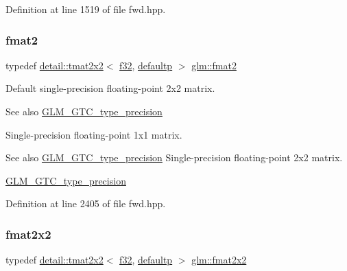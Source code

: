 Definition at line 1519 of file fwd.\+hpp.

\mbox{\label{group__gtc__type__precision_ga96b15c5eaecce87b352dab5d373da979}} 
\subsubsection{\texorpdfstring{fmat2}{fmat2}}
{\footnotesize\ttfamily typedef \hyperlink{structglm_1_1detail_1_1tmat2x2}{detail\+::tmat2x2}$<$ \hyperlink{group__gtc__type__precision_ga0ec999b57f5330d9021256e96038df04}{f32}, \hyperlink{namespaceglm_a0f04f086094c747d227af4425893f545a9d21ccd8b5a009ec7eb7677befc3bf51}{defaultp} $>$ \hyperlink{group__gtc__type__precision_ga96b15c5eaecce87b352dab5d373da979}{glm\+::fmat2}}

Default single-\/precision floating-\/point 2x2 matrix. \begin{DoxySeeAlso}{See also}
\hyperlink{group__gtc__type__precision}{G\+L\+M\+\_\+\+G\+T\+C\+\_\+type\+\_\+precision}
\end{DoxySeeAlso}
Single-\/precision floating-\/point 1x1 matrix. \begin{DoxySeeAlso}{See also}
\hyperlink{group__gtc__type__precision}{G\+L\+M\+\_\+\+G\+T\+C\+\_\+type\+\_\+precision} Single-\/precision floating-\/point 2x2 matrix. 

\hyperlink{group__gtc__type__precision}{G\+L\+M\+\_\+\+G\+T\+C\+\_\+type\+\_\+precision} 
\end{DoxySeeAlso}


Definition at line 2405 of file fwd.\+hpp.

\mbox{\label{group__gtc__type__precision_gada7823c23ae249dccaecb5a016c667f4}} 
\subsubsection{\texorpdfstring{fmat2x2}{fmat2x2}}
{\footnotesize\ttfamily typedef \hyperlink{structglm_1_1detail_1_1tmat2x2}{detail\+::tmat2x2}$<$ \hyperlink{group__gtc__type__precision_ga0ec999b57f5330d9021256e96038df04}{f32}, \hyperlink{namespaceglm_a0f04f086094c747d227af4425893f545a9d21ccd8b5a009ec7eb7677befc3bf51}{defaultp} $>$ \hyperlink{group__gtc__type__precision_gada7823c23ae249dccaecb5a016c667f4}{glm\+::fmat2x2}}

